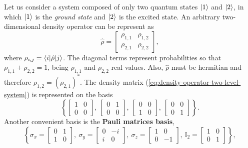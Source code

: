 Let us consider a system composed of only two quantum states $ \ket{1} $ and $ \ket{2} $, in which $ \ket{1} $ is the \textit{ground state} and $ \ket{2} $ is the excited state. An arbitrary two-dimensional density operator can be represent as
\begin{equation}
	\hat{\rho} = \left[ \begin{matrix} \rho_{1, 1} & \rho_{1, 2} \\ \rho_{2, 1} & \rho_{2, 2}\end{matrix}\right],
	\label{eq:density-operator-two-level-system}
\end{equation}
where $ \rho_{i,j} = \braket{i|\hat{\rho}|j} $. The diagonal terms represent probabilities so that $ \rho_{1,1} + \rho_{2,2} = 1 $, being $\rho_{1,1} $ and $ \rho_{2,2} $ real values. Also, $ \hat{\rho} $ must be hermitian and therefore $ \rho_{1,2} = (\rho_{2,1})^* $. The density matrix (\ref{eq:density-operator-two-level-system}) is represented on the basis
\begin{equation}
	\left\{\left[ \begin{matrix} 1 & 0 \\ 0 & 0 \end{matrix} \right],\ \left[ \begin{matrix} 0 & 1 \\ 0 & 0 \end{matrix} \right],\ \left[ \begin{matrix} 0 & 0 \\ 1 & 0 \end{matrix} \right],\ \left[ \begin{matrix} 0 & 0 \\ 0 & 1 \end{matrix} \right] \right\}.
\end{equation}
Another convenient basis is the \textbf{Pauli matrices basis},
\begin{equation}
	\left\{\sigma_x = \left[ \begin{matrix} 0 & 1 \\ 1 & 0 \end{matrix} \right],\ \sigma_y = \left[ \begin{matrix} 0 & -i \\ i & 0 \end{matrix} \right],\ \sigma_z = \left[ \begin{matrix} 1 & 0 \\ 0 & -1 \end{matrix} \right],\ \mathbb{I}_2 = \left[ \begin{matrix} 1 & 0 \\ 0 & 1 \end{matrix} \right] \right\},
\end{equation}
